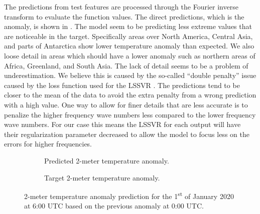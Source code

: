 The predictions from test features are processed through the Fourier inverse transform to evaluate the function values. The direct predictions, which is the anomaly, is shown in . The model seem to be predicting less extreme values that are noticeable in the target. Specifically areas over North America, Central Asia, and parts of Antarctica show lower temperature anomaly than expected. We also loose detail in areas which should have a lower anomaly such as northern areas of Africa, Greenland, and South Asia. The lack of detail seems to be a problem of underestimation. We believe this is caused by the so-called \enquote{double penalty} issue caused by the loss function used for the LSSVR \autocite{lledoScaledependentVerificationPrecipitation2023}. The predictions tend to be closer to the mean of the data to avoid the extra penalty from a wrong prediction with a high value. One way to allow for finer details that are less accurate is to penalize the higher frequency wave numbers less compared to the lower frequency wave numbers. For our case this means the LSSVR for each output will have their regularization parameter decreased to allow the model to focus less on the errors for higher frequencies.
\begin{figure}[H]
  \centering
  \begin{subfigure}{\linewidth}
    \begin{adjustbox}{width=\linewidth}
      
    \end{adjustbox}
    \caption{Predicted 2-meter temperature anomaly.}\label{fig:sc3_anomaly_pred}
  \end{subfigure}
  \begin{subfigure}{\linewidth}
    \begin{adjustbox}{width=\linewidth}
      
    \end{adjustbox}
    \caption{Target 2-meter temperature anomaly.}\label{fig:sc3_anomaly_target}
  \end{subfigure}
  \caption{2-meter temperature anomaly prediction for the 1\textsuperscript{st} of January 2020 at 6:00 UTC based on the previous anomaly at 0:00 UTC.}\label{fig:sc3_anomaly_predictions}
\end{figure}

